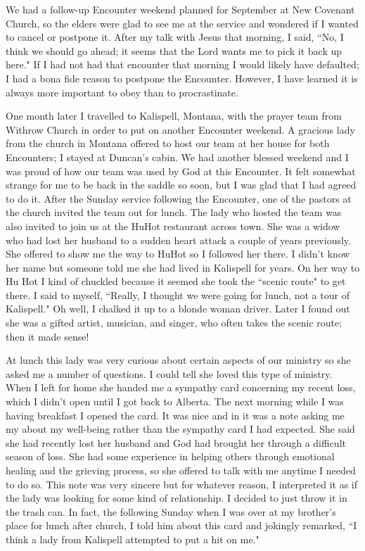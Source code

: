 \documentclass[oneside]{book}
\begin{document}
We had a follow-up Encounter weekend planned for September at New Covenant Church, so the elders were glad to see me at the service and wondered if I wanted to cancel or postpone it. After my talk with Jesus that morning, I said, ``No, I think we should go ahead; it seems that the Lord wants me to pick it back up here." If I had not had that encounter that morning I would likely have defaulted; I had a bona fide reason to postpone the Encounter. However, I have learned it is always more important to obey than to procrastinate. 

One month later I travelled to Kalispell, Montana, with the prayer team from Withrow Church in order to put on another Encounter weekend. A gracious lady from the church in Montana offered to host our team at her house for both Encounters; I stayed at Duncan's cabin. We had another blessed weekend and I was proud of how our team was used by God at this Encounter. It felt somewhat strange for me to be back in the saddle so soon, but I was glad that I had agreed to do it. After the Sunday service following the Encounter, one of the pastors at the church invited the team out for lunch. The lady who hosted the team was also invited to join us at the HuHot restaurant across town. She was a widow who had lost her husband to a sudden heart attack a couple of years previously. She offered to show me the way to HuHot so I followed her there. I didn't know her name but someone told me she had lived in Kalispell for years. On her way to Hu Hot I kind of chuckled because it seemed she took the ``scenic route" to get there. I said to myself, ``Really, I thought we were going for lunch, not a tour of Kalispell." Oh well, I chalked it up to a blonde woman driver. Later I found out she was a gifted artist, musician, and singer, who often takes the scenic route; then it made sense! 

At lunch this lady was very curious about certain aspects of our ministry so she asked me a number of questions. I could tell she loved this type of ministry. When I left for home she handed me a sympathy card concerning my recent loss, which I didn't open until I got back to Alberta. The next morning while I was having breakfast I opened the card. It was nice and in it was a note asking me my about my well-being rather than the sympathy card I had expected. She said she had recently lost her husband and God had brought her through a difficult season of loss. She had some experience in helping others through emotional healing and the grieving process, so she offered to talk with me anytime I needed to do so. This note was very sincere but for whatever reason, I interpreted it as if the lady was looking for some kind of relationship. I decided to just throw it in the trash can. In fact, the following Sunday when I was over at my brother's place for lunch after church, I told him about this card and jokingly remarked, ``I think a lady from Kalispell attempted to put a hit on me." 
\end{document}
